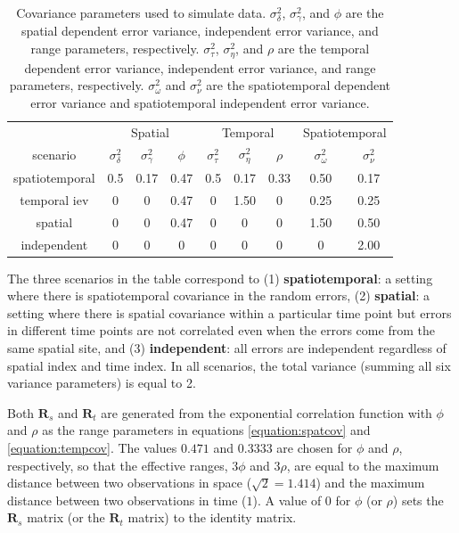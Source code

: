 \documentclass[]{interact}
\theoremstyle{plain}%
\theoremstyle{definition}
\theoremstyle{remark}
\begin{document}
\begin{table}[H]

\caption{\label{tab:simparmtab}Covariance parameters used to simulate data. $\sigma^2_{\delta}$, $\sigma^2_{\gamma}$, and $\phi$ are the spatial dependent error variance, independent error variance, and range parameters, respectively. $\sigma^2_{\tau}$, $\sigma^2_{\eta}$, and $\rho$ are the temporal dependent error variance, independent error variance, and range parameters, respectively. $\sigma^2_{\omega}$ and $\sigma^2_{\nu}$ are the spatiotemporal dependent error variance and spatiotemporal independent error variance.}
\centering
\begin{tabular}[t]{ccccccccc}
\toprule
\multicolumn{1}{c}{ } & \multicolumn{3}{c}{Spatial} & \multicolumn{3}{c}{Temporal} & \multicolumn{2}{c}{Spatiotemporal} \\
\cmidrule(l{3pt}r{3pt}){2-4} \cmidrule(l{3pt}r{3pt}){5-7} \cmidrule(l{3pt}r{3pt}){8-9}
scenario & $\sigma^2_{\delta}$ & $\sigma^2_{\gamma}$ & $\phi$ & $\sigma^2_{\tau}$ & $\sigma^2_{\eta}$ & $\rho$ & $\sigma^2_{\omega}$ & $\sigma^2_{\nu}$\\
\midrule
spatiotemporal & 0.5 & 0.17 & 0.47 & 0.5 & 0.17 & 0.33 & 0.50 & 0.17\\
temporal iev & 0 & 0 & 0.47 & 0 & 1.50 & 0 & 0.25 & 0.25\\
spatial & 0 & 0 & 0.47 & 0 & 0 & 0 & 1.50 & 0.50\\
independent & 0 & 0 & 0 & 0 & 0 & 0 & 0 & 2.00\\
\bottomrule
\end{tabular}
\end{table}

The three scenarios in the table correspond to (1)
\textbf{spatiotemporal}: a setting where there is spatiotemporal
covariance in the random errors, (2) \textbf{spatial}: a setting where
there is spatial covariance within a particular time point but errors in
different time points are not correlated even when the errors come from
the same spatial site, and (3) \textbf{independent}: all errors are
independent regardless of spatial index and time index. In all
scenarios, the total variance (summing all six variance parameters) is
equal to 2.

Both \(\mathbf{R}_{s}\) and \(\mathbf{R}_t\) are generated from the
exponential correlation function with \(\phi\) and \(\rho\) as the range
parameters in equations \ref{equation:spatcov} and
\ref{equation:tempcov}. The values \(0.471\) and \(0.3333\) are chosen
for \(\phi\) and \(\rho\), respectively, so that the effective ranges,
\(3 \phi\) and \(3 \rho\), are equal to the maximum distance between two
observations in space (\(\sqrt2 = 1.414\)) and the maximum distance
between two observations in time (\(1\)). A value of 0 for \(\phi\) (or
\(\rho\)) sets the \(\mathbf{R}_{s}\) matrix (or the \(\mathbf{R}_t\)
matrix) to the identity matrix.
\end{document}
